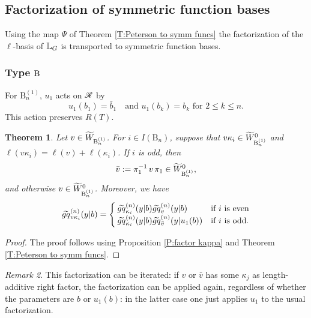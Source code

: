 \documentclass[a4paper]{amsart}
\newtheorem{thm}{Theorem}[section]
\theoremstyle{remark}
\newtheorem{remark}[thm]{Remark}
\numberwithin{equation}{section}
\begin{document}
\subsection{Factorization of symmetric function bases}
Using the map $\Psi$ of Theorem \ref{T:Peterson to symm funcs} the factorization of the
$\ell$-basis of $\LG$ is transported to symmetric function bases.

\subsubsection*{Type $\B{}$} For $\mathrm{B}_n^{(1)}$, $u_1$ acts on $\sR$ by 
\begin{equation*}u_1(b_1)=\bar{b}_1\quad\text{and $u_1(b_k)=b_k$ for $2\le k\le n$}.
\end{equation*}This action preserves \(R(T)\).







\begin{thm}\label{thm_fac_type_B}
    Let \(v \in \widetilde{W}_{\B{n}^{(1)}}\). For $i\in I(\mathrm{B}_n)$, suppose that $v\kappa_i \in \WBexgr{n}$ and 
$\ell(v\kappa_i) = \ell(v) + \ell(\kappa_i)$. 
If $i$ is odd, then 
\[
\bar{v} := \pi_1^{-1} \, v \, \pi_1 \in \WBexgr{n},
\]
and otherwise \(v \in \WBexgr{n}\). Moreover, we have
\begin{equation}
\tgq{v\kappa_i}{n}(y| b) =
\begin{cases}
\tgq{\kappa_i}{n}(y| b)\tgq{v}{n} (y| b) & \text{if $i$ is even} \\
\tgq{\kappa_i}{n}(y| b) \tgq{\bar{v}}{n}(y| u_1(b)) & \text{if $i$ is odd}.
\end{cases}
\end{equation}
\end{thm}
\begin{proof}
The proof follows using Proposition \ref{P:factor kappa} and Theorem \ref{T:Peterson to symm funcs}.    
\end{proof}



\begin{remark} This factorization can be iterated: if $v$ or $\bar{v}$ has some $\kappa_j$ as length-additive right factor, the factorization can be applied again, regardless of whether the parameters are $b$ or $u_1(b)$: in the latter case one just applies $u_1$ to the usual factorization.
\end{remark}
\end{document}
